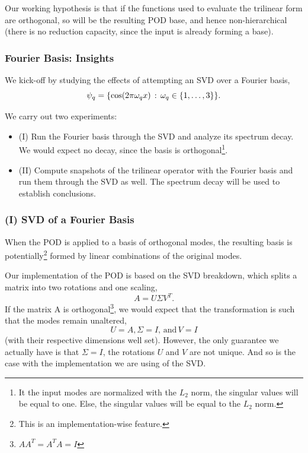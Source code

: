 \documentclass[../../thesis.tex]{subfiles}
\begin{document}
Our working hypothesis is that if the functions used to evaluate the 
trilinear form are orthogonal, so will be the resulting POD base,
and hence non-hierarchical 
(there is no reduction capacity, since the input is already forming a base).

\subsubsection{Fourier Basis: Insights}
We kick-off by studying the effects of attempting an SVD over a Fourier basis, 
\begin{equation}
    \psi_q = \qty{\cos(2 \pi \omega_q x) \, : \, \omega_q \in \qty{1, \ldots, 3}}.
\end{equation}

We carry out two experiments:
\begin{itemize}
    \item (I) Run the Fourier basis through the SVD and analyze its spectrum decay. 
    We would expect no decay, since the basis is orthogonal\footnote
    {
        It the input modes are normalized with the $L_2$ norm, 
        the singular values will be equal to one.
        Else, the singular values will be equal to the $L_2$ norm.
    }.
    \item (II) Compute snapshots of the trilinear operator with the Fourier basis
    and run them through the SVD as well.
    The spectrum decay will be used to establish conclusions. 
\end{itemize}

\subsubsection{(I) SVD of a Fourier Basis}
When the POD is applied to a basis of orthogonal modes, 
the resulting basis is potentially\footnote{
    This is an implementation-wise feature.
} formed 
by linear combinations of the original modes.

Our implementation of the POD is based on the SVD breakdown, which splits a matrix into 
two rotations and one scaling,
\begin{equation}
    A = U \Sigma V^T.
\end{equation}
If the matrix A is orthogonal\footnote
{
    $AA^T = A^T A = I$
},
we would expect that the transformation is such that the modes
remain unaltered,
\begin{equation*}
    U=A, \Sigma = I, \, \text{and} \, V=I
\end{equation*}
(with their respective dimensions well set).
However, the only guarantee we actually have is that $\Sigma = I$,
the rotations $U$ and $V$ are not unique.
And so is the case with the implementation we are using of the SVD.
\end{document}
